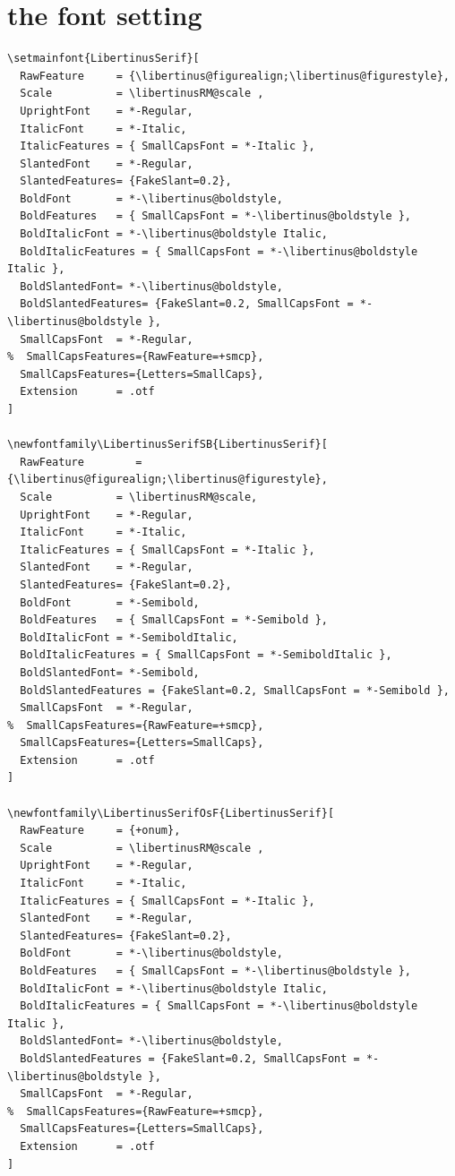 \documentclass[ngerman,spanish,polish,english,a4paper]{article}
\begin{document}
\section{the font setting}
\begin{verbatim}
\setmainfont{LibertinusSerif}[ 
  RawFeature     = {\libertinus@figurealign;\libertinus@figurestyle},
  Scale          = \libertinusRM@scale ,
  UprightFont    = *-Regular,
  ItalicFont     = *-Italic,
  ItalicFeatures = { SmallCapsFont = *-Italic },
  SlantedFont    = *-Regular,
  SlantedFeatures= {FakeSlant=0.2},
  BoldFont       = *-\libertinus@boldstyle,
  BoldFeatures   = { SmallCapsFont = *-\libertinus@boldstyle },
  BoldItalicFont = *-\libertinus@boldstyle Italic,
  BoldItalicFeatures = { SmallCapsFont = *-\libertinus@boldstyle Italic },
  BoldSlantedFont= *-\libertinus@boldstyle,
  BoldSlantedFeatures= {FakeSlant=0.2, SmallCapsFont = *-\libertinus@boldstyle },
  SmallCapsFont  = *-Regular,
%  SmallCapsFeatures={RawFeature=+smcp},
  SmallCapsFeatures={Letters=SmallCaps}, 
  Extension      = .otf  
]

\newfontfamily\LibertinusSerifSB{LibertinusSerif}[
  RawFeature        = {\libertinus@figurealign;\libertinus@figurestyle},
  Scale          = \libertinusRM@scale,
  UprightFont    = *-Regular,
  ItalicFont     = *-Italic,
  ItalicFeatures = { SmallCapsFont = *-Italic },
  SlantedFont    = *-Regular,
  SlantedFeatures= {FakeSlant=0.2},
  BoldFont       = *-Semibold, 
  BoldFeatures   = { SmallCapsFont = *-Semibold },
  BoldItalicFont = *-SemiboldItalic,
  BoldItalicFeatures = { SmallCapsFont = *-SemiboldItalic },
  BoldSlantedFont= *-Semibold,
  BoldSlantedFeatures = {FakeSlant=0.2, SmallCapsFont = *-Semibold },
  SmallCapsFont  = *-Regular,
%  SmallCapsFeatures={RawFeature=+smcp},
  SmallCapsFeatures={Letters=SmallCaps}, 
  Extension      = .otf  
]

\newfontfamily\LibertinusSerifOsF{LibertinusSerif}[
  RawFeature     = {+onum},
  Scale          = \libertinusRM@scale ,
  UprightFont    = *-Regular,
  ItalicFont     = *-Italic,
  ItalicFeatures = { SmallCapsFont = *-Italic },
  SlantedFont    = *-Regular,
  SlantedFeatures= {FakeSlant=0.2},
  BoldFont       = *-\libertinus@boldstyle, 
  BoldFeatures   = { SmallCapsFont = *-\libertinus@boldstyle },
  BoldItalicFont = *-\libertinus@boldstyle Italic,
  BoldItalicFeatures = { SmallCapsFont = *-\libertinus@boldstyle Italic },
  BoldSlantedFont= *-\libertinus@boldstyle,
  BoldSlantedFeatures = {FakeSlant=0.2, SmallCapsFont = *-\libertinus@boldstyle },
  SmallCapsFont  = *-Regular,
%  SmallCapsFeatures={RawFeature=+smcp},
  SmallCapsFeatures={Letters=SmallCaps}, 
  Extension      = .otf  
]


\end{verbatim}
\end{document}
